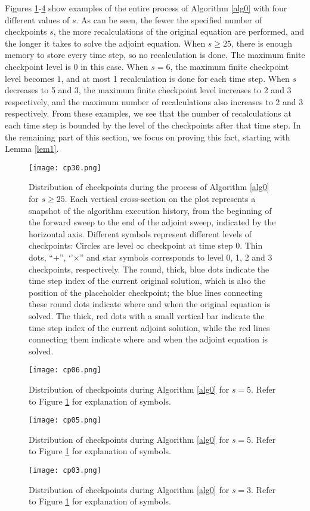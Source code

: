 \documentclass[oneeqnum, onethmnum, onefignum, onetabnum]{siamltex}
\begin{document}
Figures \ref{bigfig1}-\ref{bigfig4} show examples of the entire process
of Algorithm \ref{alg0} with four different values of $s$.  As can be
seen, the fewer the specified number of checkpoints $s$, the more
recalculations of the original equation are performed, and the longer it
takes to solve the adjoint equation.  When $s \ge 25$, there is enough
memory to store every time step, so no recalculation is done.  The maximum
finite checkpoint level is $0$ in this case.  When $s = 6$, the maximum
finite checkpoint level becomes $1$, and at most 1 recalculation is done for
each time step.  When $s$ decreases to 5 and 3, the maximum finite
checkpoint level increases to 2 and 3 respectively, and the maximum number
of recalculations also increases to 2 and 3 respectively.
From these examples, we see that the number of recalculations at each time
step is bounded
by the level of the checkpoints after that time step.  In the remaining part
of this section, we focus on proving this fact, starting with Lemma \ref{lem1}.
\begin{figure}[htp] \center
    \texttt{[image: cp30.png]}
    \caption{Distribution of checkpoints during the process of Algorithm
    \ref{alg0} for $s \ge 25$.
    Each vertical cross-section on the plot represents a
    snapshot of the algorithm execution history, from the beginning of the
    forward sweep to the end of the adjoint sweep, indicated by the
    horizontal axis.  Different symbols represent different levels of
    checkpoints:  Circles are level $\infty$ checkpoint at time step 0.
    Thin dots, ``+'', `'$\times$'' and star symbols corresponds to
    level 0, 1, 2 and 3 checkpoints, respectively.
    The round, thick, blue dots indicate the time
    step index of the current original solution, which is also the position of
    the placeholder checkpoint; the blue lines connecting these round dots
    indicate where and when the original equation is solved.
    The thick, red dots with a
    small vertical bar indicate the time step index of the current adjoint
    solution, while the red lines connecting them indicate where and when the
    adjoint equation is solved.}
\label{bigfig1}
\end{figure}
\begin{figure}[htp] \center
    \texttt{[image: cp06.png]}
    \caption{Distribution of checkpoints during Algorithm \ref{alg0} for
    $s = 5$.  Refer to Figure \ref{bigfig1} for explanation of symbols.}
\label{bigfig2}
\end{figure}
\begin{figure}[htp] \center
    \texttt{[image: cp05.png]}
    \caption{Distribution of checkpoints during Algorithm \ref{alg0} for
    $s = 5$.  Refer to Figure \ref{bigfig1} for explanation of symbols.}
\label{bigfig3}
\end{figure}
\begin{figure}[htp] \center
    \texttt{[image: cp03.png]}
    \caption{Distribution of checkpoints during Algorithm \ref{alg0} for
    $s = 3$.  Refer to Figure \ref{bigfig1} for explanation of symbols.}
\label{bigfig4}
\end{figure}
\end{document}

